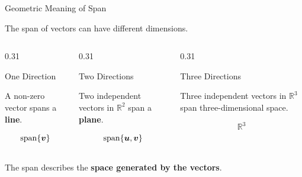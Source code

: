 \begin{frame}{Geometric Meaning of Span}

The span of vectors can have different dimensions.

\vspace{0.3cm}

\begin{columns}[T,totalwidth=\textwidth]

\begin{column}{0.31\textwidth}

\begin{block}{One Direction}

A non-zero vector spans a \textbf{line}.

\[
\operatorname{span}\{\bm{v}\}
\]

\end{block}

\end{column}

\begin{column}{0.31\textwidth}

\begin{block}{Two Directions}

Two independent vectors in $\mathbb{R}^2$ span a \textbf{plane}.

\[
\operatorname{span}\{\bm{u},\bm{v}\}
\]

\end{block}

\end{column}

\begin{column}{0.31\textwidth}

\begin{block}{Three Directions}

Three independent vectors in $\mathbb{R}^3$ span
three-dimensional space.

\[
\mathbb{R}^3
\]

\end{block}

\end{column}

\end{columns}

\vspace{0.5cm}

\begin{center}
The span describes the \textbf{space generated by the vectors}.
\end{center}

\end{frame}


